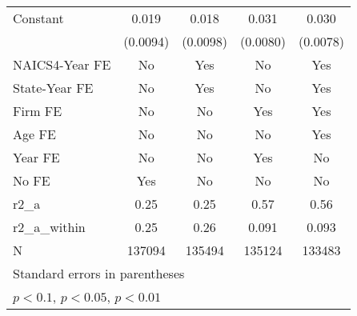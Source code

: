 {\begin{tabular}{l*{4}{c}}
\addlinespace
Constant            &       0.019\sym{**} &       0.018\sym{*}  &       0.031\sym{***}&       0.030\sym{***}\\
                    &    (0.0094)         &    (0.0098)         &    (0.0080)         &    (0.0078)         \\
\addlinespace
NAICS4-Year FE      &          No         &         Yes         &          No         &         Yes         \\
\addlinespace
State-Year FE       &          No         &         Yes         &          No         &         Yes         \\
\addlinespace
Firm FE             &          No         &          No         &         Yes         &         Yes         \\
\addlinespace
Age FE              &          No         &          No         &          No         &         Yes         \\
\addlinespace
Year FE             &          No         &          No         &         Yes         &          No         \\
\addlinespace
No FE               &         Yes         &          No         &          No         &          No         \\
\midrule
r2\_a                &        0.25         &        0.25         &        0.57         &        0.56         \\
r2\_a\_within         &        0.25         &        0.26         &       0.091         &       0.093         \\
N                   &      137094         &      135494         &      135124         &      133483         \\
\bottomrule
\multicolumn{5}{l}{\footnotesize Standard errors in parentheses}\\
\multicolumn{5}{l}{\footnotesize \sym{*} \(p<0.1\), \sym{**} \(p<0.05\), \sym{***} \(p<0.01\)}\\
\end{tabular}
}
